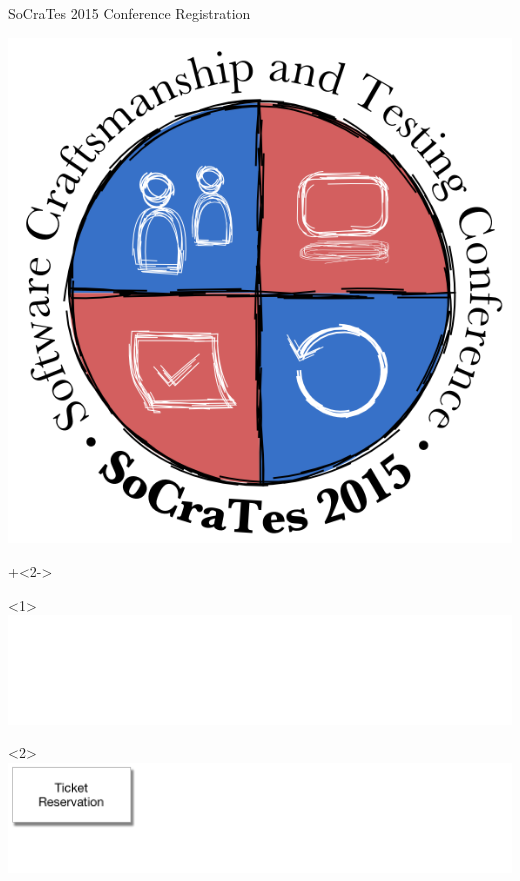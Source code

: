 \begin{frame}[fragile]{SoCraTes 2015 Conference Registration}

\begin{center}
\includegraphics[height=.4\textheight]{../SoCraTes_2015.png}
\end{center}

\vspace{2em}

\onslide+<2->
\begin{onlyenv}<1>
\includegraphics[width=\textwidth]{../Registration0.pdf}
\end{onlyenv}

\begin{onlyenv}<2>
\includegraphics[width=\textwidth]{../Registration1.pdf}
\end{onlyenv}


\end{frame}
